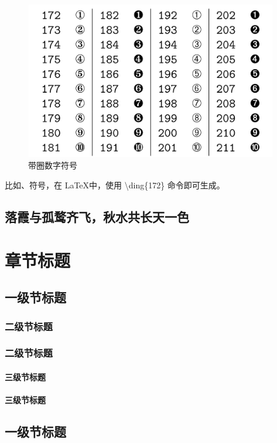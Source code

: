 \documentclass{QHUthesis}
\begin{document}
\begin{figure}[htbp]
	\centering
		\includegraphics[width=\textwidth]{带圈数字符号}
	\caption{带圈数字符号}
	\label{fig:2}
\end{figure}

比如、符号，在 \LaTeX 中，使用 \textbackslash ding\{172\}  命令即可生成。

\zhlipsum[1-3]
\section{落霞与孤鹜齐飞，秋水共长天一色}
\zhlipsum[1-5]

\chapter{章节标题}
\section{一级节标题}
\subsection{二级节标题}
\subsection{二级节标题}
\subsubsection{三级节标题}
\subsubsection{三级节标题}
\section{一级节标题}
\end{document}
